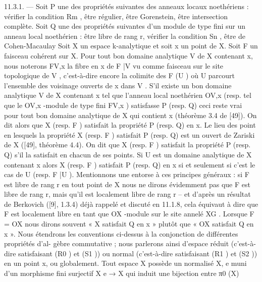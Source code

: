 \documentclass[
  10pt,
]{article}
\newenvironment{Shaded}{}{}
\newcommand{\NormalTok}[1]{#1}
\begin{document}
\begin{Shaded}
\begin{Highlighting}[]
\NormalTok{11.3.1. — Soit P une des propriétés suivantes des anneaux locaux noethériens : vérifier}
\NormalTok{la condition Rm , être régulier, être Gorenstein, être intersection complète. Soit Q une}
\NormalTok{des propriétés suivantes d’un module de type fini sur un anneau local noethérien : être}
\NormalTok{libre de rang r, vérifier la condition Sn , être de Cohen{-}Macaulay}
\NormalTok{   Soit X un espace k{-}analytique et soit x un point de X. Soit F un faisceau cohérent}
\NormalTok{sur X. Pour tout bon domaine analytique V de X contenant x, nous noterons FV,x la}
\NormalTok{fibre en x de F |V vu comme faisceau sur le site topologique de V , c’est{-}à{-}dire encore}
\NormalTok{la colimite des F (U ) où U parcourt l’ensemble des voisinage ouverts de x dans V . S’il}
\NormalTok{existe un bon domaine analytique V de X contenant x tel que l’anneau local noethérien}
\NormalTok{OV,x (resp. tel que le OV,x {-}module de type fini FV,x ) satisfasse P (resp. Q) ceci reste vrai}
\NormalTok{pour tout bon domaine analytique de X qui contient x (théorème 3.4 de [49]). On dit}
\NormalTok{alors que X (resp. F ) satisfait la propriété P (resp. Q) en x.}
\NormalTok{   Le lieu des point en lesquels la propriété X (resp. F ) satisfait P (resp. Q) est un}
\NormalTok{ouvert de Zariski de X ([49], théorème 4.4).}
\NormalTok{   On dit que X (resp. F ) satisfait la propriété P (resp. Q) s’il la satisfait en chacun de}
\NormalTok{ses points. Si U est un domaine analytique de X contenant x alors X (resp. F ) satisfait}
\NormalTok{P (resp. Q) en x si et seulement si c’est le cas de U (resp. F |U ).}
\NormalTok{   Mentionnons une entorse à ces principes généraux : si F est libre de rang r en tout}
\NormalTok{point de X nous ne dirons évidemment pas que F est libre de rang r, mais qu’il est}
\NormalTok{localement libre de rang r – et d’après un résultat de Berkovich ([9], 1.3.4) déjà rappelé et}
\NormalTok{discuté en 11.1.8, cela équivaut à dire que F est localement libre en tant que OX {-}module}
\NormalTok{sur le site annelé XG .}
\NormalTok{   Lorsque F = OX nous dirons souvent « X satisfait Q en x » plutôt que « OX satisfait}
\NormalTok{Q en x ».}
\NormalTok{   Nous étendrons les conventions ci{-}dessus à la conjonction de différentes propriétés d’al{-}}
\NormalTok{gèbre commutative ; nous parlerons ainsi d’espace réduit (c’est{-}à{-}dire satisfaisant (R0 )}
\NormalTok{et (S1 )) ou normal (c’est{-}à{-}dire satisfaisant (R1 ) et (S2 )) en un point x, ou globalement.}
\NormalTok{Tout espace X possède un normalisé X,    e muni d’un morphisme fini surjectif X    e → X qui}
\NormalTok{induit une bijection entre π0 (X)}

\end{Highlighting}
\end{Shaded}
\end{document}
